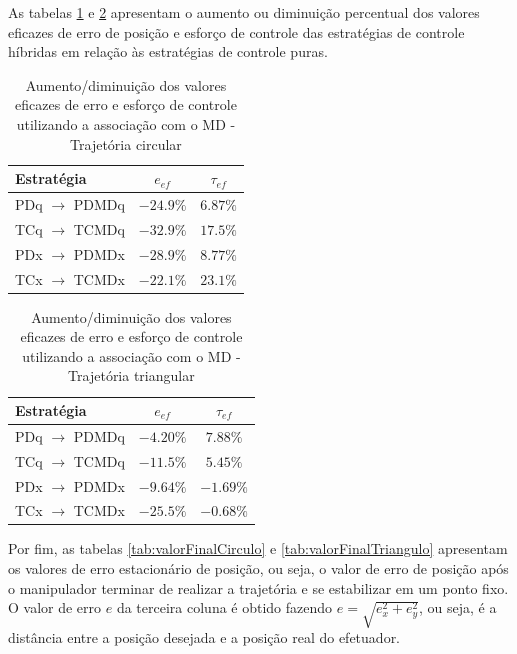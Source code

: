 \documentclass[]{politex}
\begin{document}
As tabelas \ref{tab:valoresEficazesCombCirculo} e \ref{tab:valoresEficazesCombTriangulo} apresentam o aumento ou diminuição percentual dos valores eficazes de erro de posição e esforço de controle das estratégias de controle híbridas em relação às estratégias de controle puras.

\begin{table}[H] 
\centering
\caption{Aumento/diminuição dos valores eficazes de erro e esforço de controle utilizando a associação com o MD - Trajetória circular}
\label{tab:valoresEficazesCombCirculo}
\begin{tabular}{l|c|c}
Estratégia              & $e_{ef}$  & $\tau_{ef} $ \\ \hline
PDq $\rightarrow$ PDMDq & $-24.9\%$ & $6.87\%$               \\
TCq $\rightarrow$ TCMDq & $-32.9\%$ & $17.5\%$               \\
PDx $\rightarrow$ PDMDx & $-28.9\%$ & $8.77\%$               \\
TCx $\rightarrow$ TCMDx & $-22.1\%$ & $23.1\%$               \\
\end{tabular}
\end{table}

\begin{table}[H] 
\centering
\caption{Aumento/diminuição dos valores eficazes de erro e esforço de controle utilizando a associação com o MD - Trajetória triangular}
\label{tab:valoresEficazesCombTriangulo}
\begin{tabular}{l|c|c}
Estratégia              & $e_{ef}$          & $\tau_{ef} $ \\ \hline
PDq $\rightarrow$ PDMDq & $-4.20\%$         & $7.88\%$               \\
TCq $\rightarrow$ TCMDq & $-11.5\%$         & $5.45\%$               \\
PDx $\rightarrow$ PDMDx & $-9.64\%$         & $-1.69\%$               \\
TCx $\rightarrow$ TCMDx & $-25.5\%$         & $-0.68\%$               \\
\end{tabular}
\end{table}

Por fim, as tabelas \ref{tab:valorFinalCirculo} e \ref{tab:valorFinalTriangulo} apresentam os valores de erro estacionário de posição, ou seja, o valor de erro de posição após o manipulador terminar de realizar a trajetória e se estabilizar em um ponto fixo. O valor de erro $e$ da terceira coluna é obtido fazendo $e = \sqrt{e_x^2 + e_y^2}$, ou seja, é a distância entre a posição desejada e a posição real do efetuador.
\end{document}
